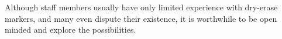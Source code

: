     Although staff members usually have only limited experience
    with dry-erase markers, and many even dispute their existence,
    it is worthwhile to be open minded and explore the possibilities.
